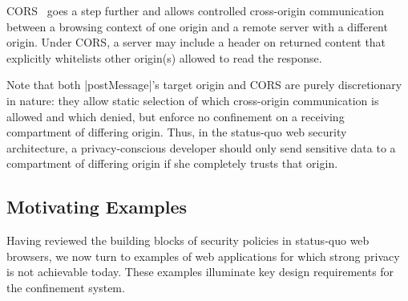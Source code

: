 
CORS~\cite{cors13} goes a step further and allows controlled
cross-origin communication between a browsing context of one origin
and a remote server with a different origin. Under CORS, a server may
include a header on returned content that explicitly whitelists other
origin(s) allowed to read the response.

%
 
Note that both \js|postMessage|'s target origin and CORS are purely
discretionary in nature: they allow static selection of which
cross-origin communication is allowed and which denied, but enforce no
confinement on a receiving compartment of differing origin. Thus, in
the status-quo web security architecture, a privacy-conscious
developer should only send sensitive data to a compartment of
differing origin if she completely trusts that origin. 

%

\subsection{Motivating Examples}
\label{sec:motivating-examples}

Having reviewed the building blocks of security policies in status-quo
web browsers, we now turn to examples of web applications for which
strong privacy is not achievable today. %
These examples
illuminate key design requirements for the \sys{} confinement
system. %

